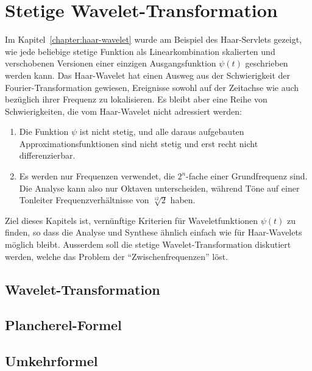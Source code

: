 %
%
%
\chapter{Stetige Wavelet-Transformation
\label{chapter:cwt}}
Im Kapitel~\ref{chapter:haar-wavelet} wurde am Beispiel des Haar-Servlets
gezeigt, wie jede beliebige stetige Funktion als Linearkombination 
skalierten und verschobenen Versionen einer einzigen Ausgangsfunktion
$\psi(t)$ geschrieben werden kann.
Das Haar-Wavelet hat einen Ausweg aus der Schwierigkeit der
Fourier-Transformation gewiesen, Ereignisse sowohl auf der Zeitachse
wie auch bezüglich ihrer Frequenz zu lokalisieren.
Es bleibt aber eine Reihe von Schwierigkeiten, die vom Haar-Wavelet nicht
adressiert werden:
\begin{enumerate}
\item
Die Funktion $\psi$ ist nicht stetig, und alle daraus aufgebauten
Approximationsfunktionen sind nicht stetig
und erst recht nicht differenzierbar.
\item
Es werden nur Frequenzen verwendet, die $2^n$-fache einer Grundfrequenz
sind.
Die Analyse kann also nur Oktaven unterscheiden, während
Töne auf einer Tonleiter Frequenzverhältnisse von $\sqrt[12]{2}$ haben.
\end{enumerate}
Ziel dieses Kapitels ist, vernünftige Kriterien für Waveletfunktionen
$\psi(t)$ zu finden, so dass die Analyse und Synthese ähnlich einfach
wie für Haar-Wavelets möglich bleibt.
Ausserdem soll die stetige Wavelet-Transformation diskutiert werden,
welche das Problem der ``Zwischenfrequenzen'' löst.



\section{Wavelet-Transformation}

\section{Plancherel-Formel}

\section{Umkehrformel}






